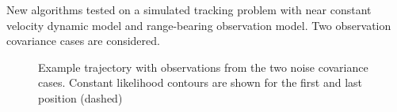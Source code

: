 \documentclass[landscape]{sciposter}
\begin{document}
\begin{multicols}{4}
New algorithms tested on a simulated tracking problem with near constant velocity dynamic model and range-bearing observation model. Two observation covariance cases are considered.
%
\begin{figure}
\centering
{}
\caption{Example trajectory with observations from the two noise covariance cases. Constant likelihood contours are shown for the first and last position (dashed)}
\end{figure}


\end{multicols}
\end{document}
